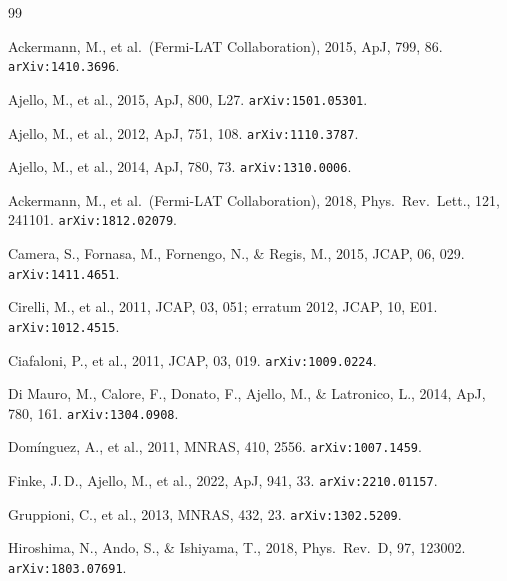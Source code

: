 \documentclass[10pt,a4paper]{article}
\begin{document}

\begin{thebibliography}{99}

Ackermann, M., et al.\ (Fermi-LAT Collaboration), 2015, ApJ, 799, 86.
\texttt{arXiv:1410.3696}.

Ajello, M., et al., 2015, ApJ, 800, L27.
\texttt{arXiv:1501.05301}.

Ajello, M., et al., 2012, ApJ, 751, 108.
\texttt{arXiv:1110.3787}.

Ajello, M., et al., 2014, ApJ, 780, 73.
\texttt{arXiv:1310.0006}.

Ackermann, M., et al.\ (Fermi-LAT Collaboration), 2018, Phys.\ Rev.\ Lett., 121, 241101.
\texttt{arXiv:1812.02079}.

Camera, S., Fornasa, M., Fornengo, N., \& Regis, M., 2015, JCAP, 06, 029.
\texttt{arXiv:1411.4651}.

Cirelli, M., et al., 2011, JCAP, 03, 051; erratum 2012, JCAP, 10, E01.
\texttt{arXiv:1012.4515}.

Ciafaloni, P., et al., 2011, JCAP, 03, 019.
\texttt{arXiv:1009.0224}.

Di Mauro, M., Calore, F., Donato, F., Ajello, M., \& Latronico, L., 2014, ApJ, 780, 161.
\texttt{arXiv:1304.0908}.

Dom\'inguez, A., et al., 2011, MNRAS, 410, 2556.
\texttt{arXiv:1007.1459}.

Finke, J.\,D., Ajello, M., et al., 2022, ApJ, 941, 33.
\texttt{arXiv:2210.01157}.

Gruppioni, C., et al., 2013, MNRAS, 432, 23.
\texttt{arXiv:1302.5209}.

Hiroshima, N., Ando, S., \& Ishiyama, T., 2018, Phys.\ Rev.\ D, 97, 123002.
\texttt{arXiv:1803.07691}.


\end{thebibliography}
\end{document}
